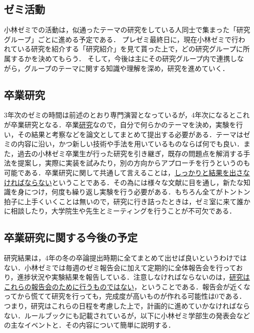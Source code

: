 \documentclass[11pt]{jarticle}
\begin{document}
\vspace{0.5cm}

\subsection{ゼミ活動}

小林ゼミでの活動は，似通ったテーマの研究をしている人同士で集まった「研究グループ」ごとに進める予定である．
プレゼミ最終日に，現在小林ゼミで行われている研究を紹介する「研究紹介」を見て貰った上で，どの研究グループに所属するかを決めてもらう．
そして，今後は主にその研究グループ内で連携しながら，グループのテーマに関する知識や理解を深め，研究を進めていく．

\subsection{卒業研究}
3年次のゼミの時間は前述のとおり専門演習となっているが，4年次になるとこれが卒業研究となる．卒業\underline{研究}なので，自分で何らかのテーマを決め，実験を行い，その結果と考察などを論文としてまとめて提出する必要がある．テーマはゼミの内容に沿い，かつ新しい技術や手法を用いているものならば何でも良い．また，過去の小林ゼミ卒業生が行った研究を引き継ぎ，既存の問題点を解消する手法を提案し，実際に実装を試みたり，別の方向からアプローチを行うというのも可能である．卒業研究に関して共通して言えることは，\underline{しっかりと結果を出さなければならない}ということである．その為には様々な文献に目を通し，新たな知識を身につけ，何度も繰り返し実験を行う必要がある．もちろん全てがトントン拍子に上手くいくことは無いので，研究に行き詰ったときは，ゼミ室に来て誰かに相談したり，大学院生や先生とミーティングを行うことが不可欠である．

\subsection{卒業研究に関する今後の予定}
研究結果は，4年の冬の卒論提出時期に全てまとめて出せば良いというわけではない．小林ゼミでは毎週のゼミ報告会に加えて定期的に全体報告会を行っており，進捗状況や実験結果を報告している．注意しなければならないのは，\underline{研究はこれらの報告会のために行うものではない}，ということである．報告会が近くなってから慌てて研究を行っても，完成度が高いものが作れる可能性は0である．つまり，研究はこれらの日程を考慮した上で，計画的に進めていかなければならない．ルールブックにも記載されているが，以下に小林ゼミ学部生の発表会などの主なイベントと．その内容について簡単に説明する．

\vspace{0.5cm}
\end{document}
